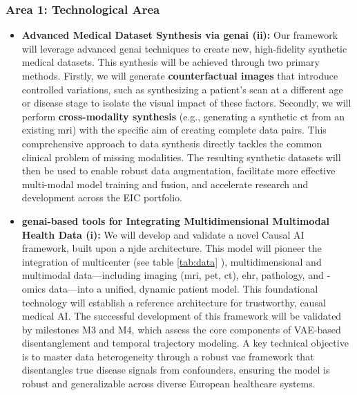 \documentclass[11pt, a4paper]{article}
\begin{document}
\subsubsection*{Area 1: Technological Area}
\begin{itemize}
 
    \item \textbf{Advanced Medical Dataset Synthesis via \gls{genai} (ii):} Our framework will leverage advanced \gls{genai} techniques to create new, high-fidelity synthetic medical datasets. This synthesis will be achieved through two primary methods. Firstly, we will generate \textbf{counterfactual images} that introduce controlled variations, such as synthesizing a patient's scan at a different age or disease stage to isolate the visual impact of these factors. Secondly, we will perform \textbf{cross-modality synthesis} (e.g., generating a synthetic \gls{ct} from an existing \gls{mri}) with the specific aim of creating complete data pairs. This comprehensive approach to data synthesis directly tackles the common clinical problem of missing modalities. The resulting synthetic datasets will then be used to enable robust data augmentation, facilitate more effective multi-modal model training and fusion, and accelerate research and development across the EIC portfolio.
    
    \item \textbf{\gls{genai}-based tools for Integrating Multidimensional Multimodal Health Data (i):} We will develop and validate a novel Causal AI framework, built upon a \gls{njde} architecture. This model will pioneer the integration of multicenter (see table \ref{tab:data}  ), multidimensional and multimodal data—including imaging (\gls{mri}, \gls{pet}, \gls{ct}), \gls{ehr}, pathology, and -omics data—into a unified, dynamic patient model. This foundational technology will establish a reference architecture for trustworthy, causal medical AI. The successful development of this framework will be validated by milestones M3 and M4, which assess the core components of VAE-based disentanglement and temporal trajectory modeling. A key technical objective is to master data heterogeneity through a robust \gls{vae} framework that disentangles true disease signals from confounders, ensuring the model is robust and generalizable across diverse European healthcare systems.




\end{itemize}
\end{document}
